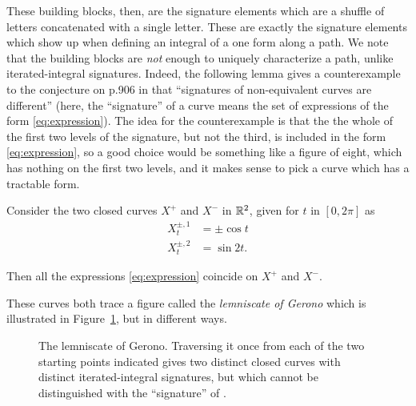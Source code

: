 These building blocks, then, are the signature elements which are a shuffle of letters concatenated with a single letter. These are exactly the signature elements which show up when defining an integral of a one form along a path.
%
We note that the building blocks %
are \emph{not} enough to uniquely characterize a path, unlike iterated-integral signatures.
Indeed, the following lemma gives a counterexample to the conjecture on p.906 in \cite{FKK}
that ``signatures of non-equivalent curves are different''
(here, the ``signature'' of a curve means the set of expressions of the form \eqref{eq:expression}). The idea for the counterexample is that the the whole of the first two levels of the signature, but not the third, is included in the form \eqref{eq:expression}, so a good choice would be something like a figure of eight, which has nothing on the first two levels, and it makes sense to pick a curve which has a tractable form.
\begin{lemma}
  Consider the two closed curves $X^+$ and $X^-$ in $\mathbb{R}^2$, given for $t$ in $[0,2\pi]$ as%
  \begin{align*}
    X^{\pm,1}_t &=\pm\cos t\\
    X^{\pm,2}_t &=\sin 2t.
  \end{align*}

  Then all the expressions \eqref{eq:expression} coincide on $X^+$ and $X^-$.
\end{lemma}

These curves both trace a figure called the \emph{lemniscate of Gerono} which is illustrated in Figure~\ref{fig:lemniscate}, but in different ways.
\begin{figure}
\begin{center}
\end{center}	
	\caption[The lemniscate of Gerono.]{\label{fig:lemniscate}The lemniscate of Gerono. Traversing it once
    from each of the two starting points
  indicated gives two distinct closed curves with distinct iterated-integral signatures, but which cannot be distinguished with the ``signature'' of \cite{FKK}.}
\end{figure}

